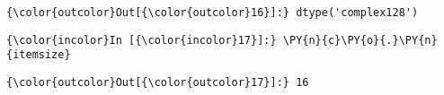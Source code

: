 \begin{Verbatim}[commandchars=\\\{\}]
{\color{outcolor}Out[{\color{outcolor}16}]:} dtype('complex128')
\end{Verbatim}
            
    \begin{Verbatim}[commandchars=\\\{\}]
{\color{incolor}In [{\color{incolor}17}]:} \PY{n}{c}\PY{o}{.}\PY{n}{itemsize}
\end{Verbatim}


\begin{Verbatim}[commandchars=\\\{\}]
{\color{outcolor}Out[{\color{outcolor}17}]:} 16
\end{Verbatim}
            

    
    
    
